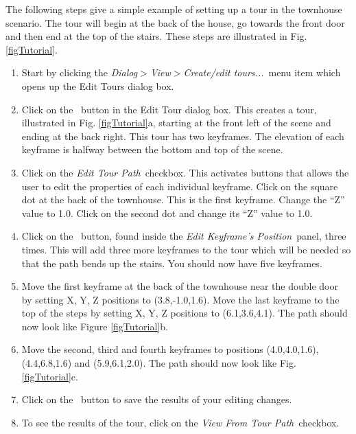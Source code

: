 \documentclass[11pt,twoside]{book}
\newcommand{\frameit}[1]{\fbox{\tt #1}}
\begin{document}
The following steps give a simple example of setting up a tour in the
townhouse scenario.  The tour will begin at the back of the house,
go towards the front door and then end at the top of the stairs.
These steps are illustrated in Fig. \ref{figTutorial}.

\begin{enumerate}
\item Start by clicking the {\em Dialog$>$View$>$Create/edit tours...}\ menu item
which opens up the Edit Tours dialog box.

\item  Click on the \frameit{New Tour}\ button in the Edit Tour dialog
box. This creates a tour, illustrated in Fig.
\ref{figTutorial}a, starting at the front left of the scene and
ending at the back right. This tour has two keyframes.  The
elevation of each keyframe is halfway between the bottom and top
of the scene.

\item Click on the {\em Edit Tour Path}\ checkbox. This activates
buttons that allows the user to edit the properties of each
individual keyframe. Click on the square dot at the back of the
townhouse. This is the first keyframe. Change the ``Z'' value to
1.0.  Click on the second dot and change its ``Z'' value to 1.0.


\item  Click on the \frameit{Add}\ button, found inside the {\em Edit
Keyframe's Position}\ panel, three times. This will add three more
keyframes to the tour which will be needed so that the path bends
up the stairs. You should now have five keyframes.

\item Move the first keyframe at the back of the townhouse near the
double door by setting X, Y, Z positions to (3.8,-1.0,1.6).
Move the last keyframe to the top
of the steps by setting X, Y, Z positions to (6.1,3.6,4.1).
The path should now look like
Figure \ref{figTutorial}b.

\item Move the second, third and fourth keyframes to positions
(4.0,4.0,1.6), (4.4,6.8,1.6) and (5.9,6.1,2.0).  The path should
now look like Fig. \ref{figTutorial}c.

\item Click on the \frameit{Save Settings}\ button to save the results
of your editing changes.

\item To see the results of the tour, click on the {\em View From
Tour Path}\ checkbox.
\end{enumerate}
\end{document}
